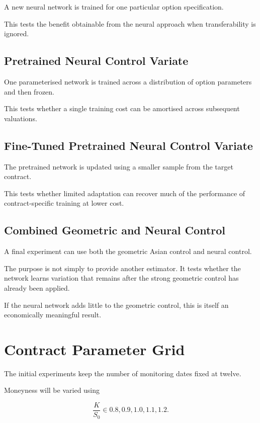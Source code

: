 \documentclass[12pt,a4paper]{report}
\begin{document}
A new neural network is trained for one particular option specification.

This tests the benefit obtainable from the neural approach when transferability is ignored.

\subsection{Pretrained Neural Control Variate}

One parameterised network is trained across a distribution of option parameters and then frozen.

This tests whether a single training cost can be amortised across subsequent valuations.

\subsection{Fine-Tuned Pretrained Neural Control Variate}

The pretrained network is updated using a smaller sample from the target contract.

This tests whether limited adaptation can recover much of the performance of contract-specific training at lower cost.

\subsection{Combined Geometric and Neural Control}

A final experiment can use both the geometric Asian control and neural control.

The purpose is not simply to provide another estimator. It tests whether the network learns variation that remains after the strong geometric control has already been applied.

If the neural network adds little to the geometric control, this is itself an economically meaningful result.

\section{Contract Parameter Grid}

The initial experiments keep the number of monitoring dates fixed at twelve.

Moneyness will be varied using

\begin{equation}
\frac{K}{S_0}
\in
{
0.8,
0.9,
1.0,
1.1,
1.2
}.
\end{equation}
\end{document}
